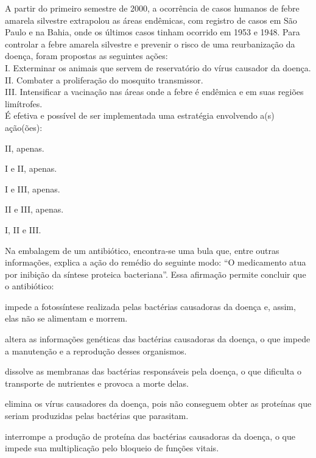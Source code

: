\questao
A partir do primeiro semestre de 2000, a ocorrência de casos humanos de febre amarela silvestre extrapolou as áreas endêmicas, com registro de casos em São Paulo e na Bahia, onde os últimos casos tinham ocorrido em 1953 e 1948. Para controlar a febre amarela silvestre e prevenir o risco de uma reurbanização da doença, foram propostas as seguintes ações: \\
I. Exterminar os animais que servem de reservatório do vírus causador da doença. \\
II. Combater a proliferação do mosquito transmissor. \\
III. Intensificar a vacinação nas áreas onde a febre é endêmica e em suas regiões limítrofes.\\
É efetiva e possível de ser implementada uma estratégia envolvendo a(s) ação(ões): 
\begin{alternativas}
\item II, apenas. 
\item I e II, apenas. 
\item I e III, apenas.
\item II e III, apenas. 
\item I, II e III.
\end{alternativas}

\questao
Na embalagem de um antibiótico, encontra-se uma bula que, entre outras informações, explica a ação do remédio do seguinte modo: ``O medicamento atua por inibição da síntese proteica bacteriana''. Essa afirmação permite concluir que o antibiótico: 
\begin{alternativas}
\item impede a fotossíntese realizada pelas bactérias causadoras da doença e, assim, elas não se alimentam e morrem. 
\item altera as informações genéticas das bactérias causadoras da doença, o que impede a manutenção e a reprodução desses organismos. 
\item dissolve as membranas das bactérias responsáveis pela doença, o que dificulta o transporte de nutrientes e provoca a morte delas.
\item elimina os vírus causadores da doença, pois não conseguem obter as proteínas que seriam produzidas pelas bactérias que parasitam. 
\item interrompe a produção de proteína das bactérias causadoras da doença, o que impede sua multiplicação pelo bloqueio de funções vitais.
\end{alternativas}


